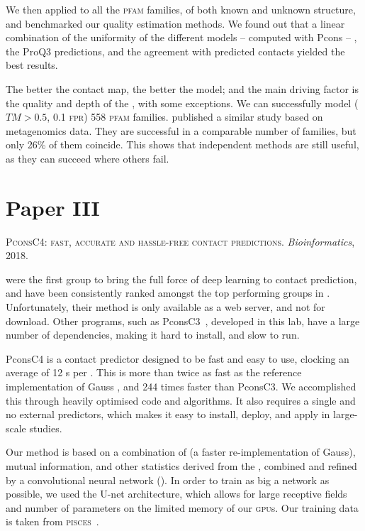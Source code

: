 We then applied to all the \textsc{pfam} families, of both known and unknown structure, and benchmarked our quality estimation methods.
We found out that a linear combination of the uniformity of the different models -- computed with Pcons \citep{pcons} -- , the ProQ3 predictions, and the agreement with predicted contacts yielded the best results.

The better the contact map, the better the model; and the main driving factor is the quality and depth of the \MSA, with some exceptions.
We can successfully model ($TM>0.5$, 0.1 \textsc{fpr}) 558 \textsc{pfam} families.
\citet{ovchinnikov2017protein} published a similar study based on metagenomics data.
They are successful in a comparable number of families, but only 26\% of them coincide.
This shows that independent methods are still useful, as they can succeed where others fail.


\section*{Paper \textcolor[cmyk]{0, 0.87, 0.68, 0.32}{III}}
\begin{center}
	\textsc{PconsC4: fast, accurate and hassle-free contact predictions.}
	\emph{Bioinformatics}, 2018.
\end{center}

\noindent
\citet{ultra_deep_contacts} were the first group to bring the full force of deep learning to contact prediction, and have been consistently ranked amongst the top performing groups in \CASP.
Unfortunately, their method is only available as a web server, and not for download.
Other programs, such as PconsC3~\citet{PconsC3}, developed in this lab, have a large number of dependencies, making it hard to install, and slow to run.

PconsC4 is a contact predictor designed to be fast and easy to use, clocking an average of 12 s per \MSA.
This is more than twice as fast as the reference implementation of Gauss\DCA{} \citep{GaussDCA}, and 244 times faster than PconsC3.
We accomplished this through heavily optimised code and algorithms.
It also requires a single \MSA{} and no external predictors, which makes it easy to install, deploy, and apply in large-scale studies.

Our method is based on a combination of \DCA{} (a faster re-implementation of Gauss\DCA{}), mutual information, and other statistics derived from the \MSA, combined and refined by a convolutional neural network (\CNN).
In order to train as big a network as possible, we used the U-net architecture, which allows for large receptive fields and number of parameters on the limited memory of our \textsc{gpu}s.
Our training data is taken from \textsc{pisces}~\citep{pdbcull}.

